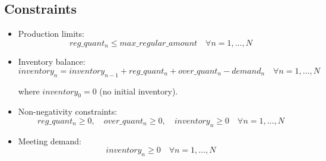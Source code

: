 \documentclass{article}
\begin{document}
\subsection*{Constraints}
\begin{itemize}
    \item Production limits:
    \[
    reg\_quant_n \leq max\_regular\_amount \quad \forall n = 1, \ldots, N
    \]
    
    \item Inventory balance:
    \[
    inventory_n = inventory_{n-1} + reg\_quant_n + over\_quant_n - demand_n \quad \forall n = 1, \ldots, N
    \]
    
    where $inventory_0 = 0$ (no initial inventory).
    
    \item Non-negativity constraints:
    \[
    reg\_quant_n \geq 0, \quad over\_quant_n \geq 0, \quad inventory_n \geq 0 \quad \forall n = 1, \ldots, N
    \]
    
    \item Meeting demand:
    \[
    inventory_n \geq 0 \quad \forall n = 1, \ldots, N
    \]
\end{itemize}
\end{document}
